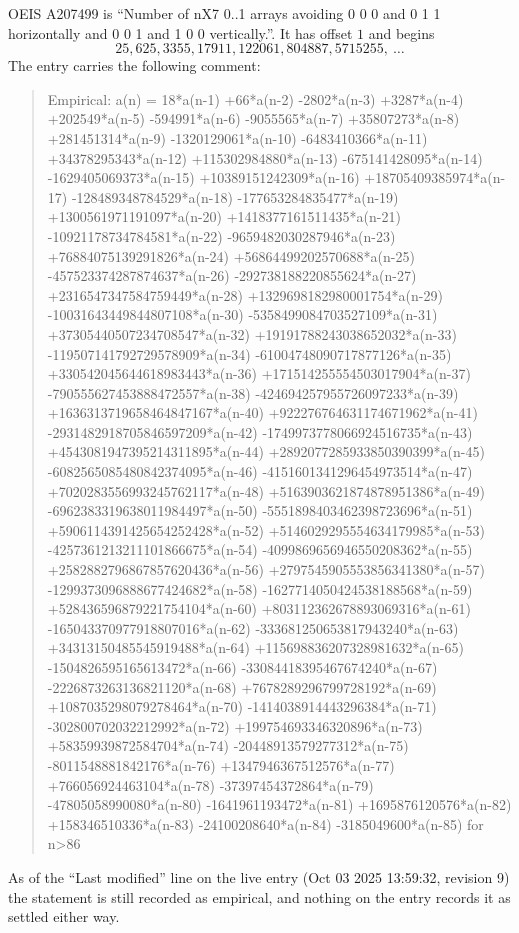 \documentclass[11pt,a4paper]{article}
\theoremstyle{plain}
\theoremstyle{definition}
\begin{document}
OEIS A207499 is ``Number of nX7 0..1 arrays avoiding 0 0 0 and 0 1 1 horizontally and 0 0 1 and 1 0 0 vertically.''. It has offset
$1$ and begins
\[
25, 625, 3355, 17911, 122061, 804887, 5715255,\ \dots
\]
The entry carries the following comment:
\begin{quote}\small
Empirical: a(n) = 18*a(n-1) +66*a(n-2) -2802*a(n-3) +3287*a(n-4) +202549*a(n-5) -594991*a(n-6) -9055565*a(n-7) +35807273*a(n-8) +281451314*a(n-9) -1320129061*a(n-10) -6483410366*a(n-11) +34378295343*a(n-12) +115302984880*a(n-13) -675141428095*a(n-14) -1629405069373*a(n-15) +10389151242309*a(n-16) +18705409385974*a(n-17) -128489348784529*a(n-18) -177653284835477*a(n-19) +1300561971191097*a(n-20) +1418377161511435*a(n-21) -10921178734784581*a(n-22) -9659482030287946*a(n-23) +76884075139291826*a(n-24) +56864499202570688*a(n-25) -457523374287874637*a(n-26) -292738188220855624*a(n-27) +2316547347584759449*a(n-28) +1329698182980001754*a(n-29) -10031643449844807108*a(n-30) -5358499084703527109*a(n-31) +37305440507234708547*a(n-32) +19191788243038652032*a(n-33) -119507141792729578909*a(n-34) -61004748090717877126*a(n-35) +330542045644618983443*a(n-36) +171514255554503017904*a(n-37) -790555627453888472557*a(n-38) -424694257955726097233*a(n-39) +1636313719658464847167*a(n-40) +922276764631174671962*a(n-41) -2931482918705846597209*a(n-42) -1749973778066924516735*a(n-43) +4543081947395214311895*a(n-44) +2892077285933850390399*a(n-45) -6082565085480842374095*a(n-46) -4151601341296454973514*a(n-47) +7020283556993245762117*a(n-48) +5163903621874878951386*a(n-49) -6962383319638011984497*a(n-50) -5551898403462398723696*a(n-51) +5906114391425654252428*a(n-52) +5146029295554634179985*a(n-53) -4257361213211101866675*a(n-54) -4099869656946550208362*a(n-55) +2582882796867857620436*a(n-56) +2797545905553856341380*a(n-57) -1299373096888677424682*a(n-58) -1627714050424538188568*a(n-59) +528436596879221754104*a(n-60) +803112362678893069316*a(n-61) -165043370977918807016*a(n-62) -333681250653817943240*a(n-63) +34313150485545919488*a(n-64) +115698836207328981632*a(n-65) -1504826595165613472*a(n-66) -33084418395467674240*a(n-67) -2226873263136821120*a(n-68) +7678289296799728192*a(n-69) +1087035298079278464*a(n-70) -1414038914443296384*a(n-71) -302800702032212992*a(n-72) +199754693346320896*a(n-73) +58359939872584704*a(n-74) -20448913579277312*a(n-75) -8011548881842176*a(n-76) +1347946367512576*a(n-77) +766056924463104*a(n-78) -37397454372864*a(n-79) -47805058990080*a(n-80) -1641961193472*a(n-81) +1695876120576*a(n-82) +158346510336*a(n-83) -24100208640*a(n-84) -3185049600*a(n-85) for n>86
\end{quote}
As of the ``Last modified'' line on the live entry (Oct 03 2025 13:59:32, revision
9) the statement is still recorded as empirical, and nothing on the entry
records it as settled either way.
\end{document}
